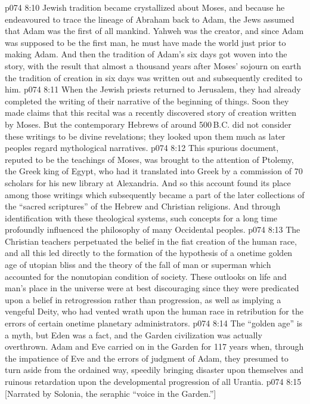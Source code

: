 \vs p074 8:10 Jewish tradition became crystallized about Moses, and because he endeavoured to trace the lineage of Abraham back to Adam, the Jews assumed that Adam was the first of all mankind. Yahweh was the creator, and since Adam was supposed to be the first man, he must have made the world just prior to making Adam. And then the tradition of Adam’s six days got woven into the story, with the result that almost a thousand years after Moses’ sojourn on earth the tradition of creation in six days was written out and subsequently credited to him.
\vs p074 8:11 When the Jewish priests returned to Jerusalem, they had already completed the writing of their narrative of the beginning of things. Soon they made claims that this recital was a recently discovered story of creation written by Moses. But the contemporary Hebrews of around 500\,B.C. did not consider these writings to be divine revelations; they looked upon them much as later peoples regard mythological narratives.
\vs p074 8:12 This spurious document, reputed to be the teachings of Moses, was brought to the attention of Ptolemy, the Greek king of Egypt, who had it translated into Greek by a commission of 70 scholars for his new library at Alexandria. And so this account found its place among those writings which subsequently became a part of the later collections of the “sacred scriptures” of the Hebrew and Christian religions. And through identification with these theological systems, such concepts for a long time profoundly influenced the philosophy of many Occidental peoples.
\vs p074 8:13 The Christian teachers perpetuated the belief in the fiat creation of the human race, and all this led directly to the formation of the hypothesis of a onetime golden age of utopian bliss and the theory of the fall of man or superman which accounted for the nonutopian condition of society. These outlooks on life and man’s place in the universe were at best discouraging since they were predicated upon a belief in retrogression rather than progression, as well as implying a vengeful Deity, who had vented wrath upon the human race in retribution for the errors of certain onetime planetary administrators.
\vs p074 8:14 \pc The “golden age” is a myth, but Eden was a fact, and the Garden civilization was actually overthrown. Adam and Eve carried on in the Garden for 117 years when, through the impatience of Eve and the errors of judgment of Adam, they presumed to turn aside from the ordained way, speedily bringing disaster upon themselves and ruinous retardation upon the developmental progression of all Urantia.
\vsetoff
\vs p074 8:15 [Narrated by Solonia, the seraphic “voice in the Garden.”]
\quizlink
{}

